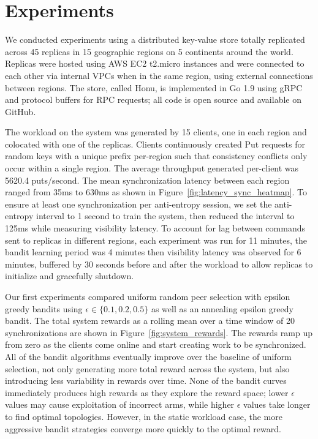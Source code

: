 \section{Experiments}

We conducted experiments using a distributed key-value store totally
replicated across 45 replicas in 15 geographic regions on 5 continents
around the world.
Replicas were hosted using AWS EC2 t2.micro instances and were connected to
each other via internal VPCs when in the same region, using external
connections between regions.
The store, called Honu, is implemented in Go 1.9 using gRPC and protocol
buffers for RPC requests; all code is open source and available on GitHub.

The workload on the system was generated by 15 clients, one in each region and
colocated with one of the replicas.
Clients continuously created Put requests for random keys with a unique
prefix per-region such that consistency conflicts only occur within a
single region.
The average throughput generated per-client was 5620.4 puts/second.
The mean synchronization latency between each region ranged from 35ms to
630ms as shown in Figure~\ref{fig:latency_sync_heatmap}.
To ensure at least one synchronization per anti-entropy session, we set the
anti-entropy interval to 1 second to train the system, then reduced the
interval to 125ms while measuring visibility latency.
To account for lag between commands sent to replicas in different regions,
each experiment was run for 11 minutes, the bandit learning period was 4
minutes then visibility latency was observed for 6 minutes, buffered by 30
seconds before and after the workload to allow replicas to initialize and
gracefully shutdown.

Our first experiments compared uniform random peer selection with epsilon
greedy bandits using $\epsilon \in \{0.1, 0.2, 0.5\}$ as well as an annealing
epsilon greedy bandit.
The total system rewards as a rolling mean over a time window of 20
synchronizations are shown in Figure~\ref{fig:system_rewards}.
The rewards ramp up from zero as the clients come online and start
creating work to be synchronized.
All of the bandit algorithms eventually improve over the baseline of uniform
selection, not only generating more total reward across the system, but also
introducing less variability in rewards over time.
None of the bandit curves immediately produces high rewards as they explore
the reward space; lower $\epsilon$ values may cause exploitation of incorrect
arms, while higher $\epsilon$ values take longer to find optimal topologies.
However, in the static workload case, the more aggressive bandit strategies
converge more quickly to the optimal reward.

